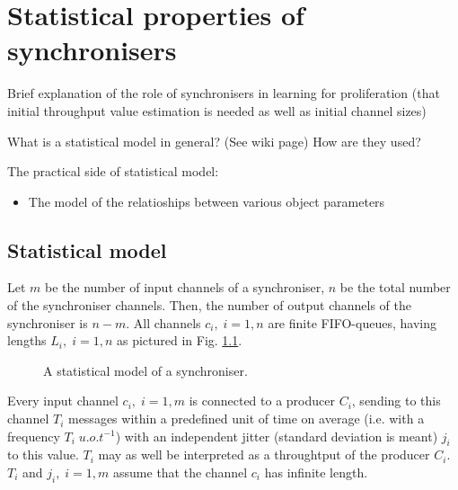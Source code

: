 \chapter{Statistical properties of synchronisers}
Brief explanation of the role of synchronisers in learning for proliferation (that initial throughput value estimation is needed as well as initial channel sizes)

What is a statistical model in general? (See wiki page) How are they used?

The practical side of statistical model:
  \begin{itemize}
  \item The model of the relatioships between various object parameters
  \end{itemize}


\section{Statistical model}
Let $m$ be the number of input channels of a synchroniser, $n$ be the total number of the synchroniser channels. Then, the number of output channels of the synchroniser is $n-m$. All channels $c_{i}, \; i = 1,n$ are finite FIFO-queues, having lengths $L_i, \; i = 1,n$ as pictured in Fig. \ref{fig:stat_mod}.

  \begin{figure}[h] %
  \def\svgwidth{14cm} %
  
  \caption{A statistical model of a synchroniser.}
  \label{fig:stat_mod}
  \end{figure}

Every input channel $c_{i}, \; i = 1,m$ is connected to a producer $C_{i}$, sending to this channel $T_{i}$ messages within a predefined unit of time on average (i.e. with a frequency $T_{i} \; u.o.t^{-1}$) with an independent jitter (standard deviation is meant) $j_{i}$ to this value. $T_{i}$ may as well be interpreted as a throughtput of the producer $C_{i}$. $T_{i}$ and $j_{i}, \; i=1,m$ assume that the channel $c_{i}$ has infinite length.

